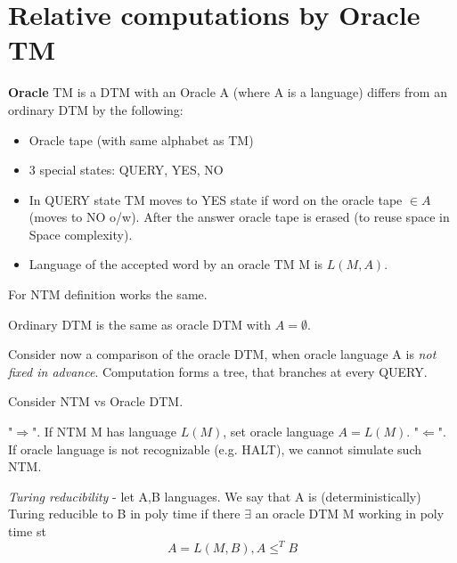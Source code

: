 \section{\texorpdfstring{Relative computations by Oracle TM}{Relative computations by Oracle TM}}
\vspace{5mm}
\large

\begin{definition}
	\textbf{Oracle} TM is a DTM with an Oracle A (where A is a language) differs from an ordinary DTM by the following:
	\begin{itemize}
		\item Oracle tape (with same alphabet as TM)
		\item 3 special states: QUERY, YES, NO
		\item In QUERY state TM moves to YES state if word on the oracle tape $\in A$ (moves to NO o/w).
			After the answer oracle tape is erased (to reuse space in Space complexity).
		\item Language of the accepted word by an oracle TM M is $L(M, A)$.
	\end{itemize}
\end{definition}

\begin{note}
	For NTM definition works the same.
\end{note}

\begin{note}
	Ordinary DTM is the same as oracle DTM with $A = \emptyset$.
\end{note}

Consider now a comparison of the oracle DTM, when oracle language A is \emph{not fixed in advance}.
Computation forms a tree, that branches at every QUERY.

\begin{observation}
	Consider NTM vs Oracle DTM.

	"$\Rightarrow$". If NTM M has language $L(M)$, set oracle language $A = L(M)$.
	"$\Leftarrow$". If oracle language is not recognizable (e.g. HALT), we cannot simulate such NTM.
\end{observation}

\begin{definition}
	\emph{Turing reducibility} - let A,B languages.
	We say that A is (deterministically) Turing reducible to B in poly time if there $\exists$ an oracle DTM M working in poly time st
	\[ A = L(M, B), A \leq^T B \]
\end{definition}

